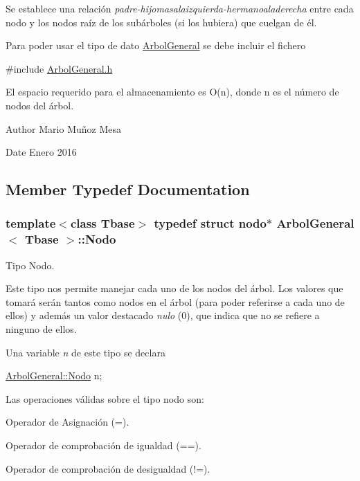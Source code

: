Se establece una relación {\itshape padre-\/hijomasalaizquierda-\/hermanoaladerecha} entre cada nodo y los nodos raíz de los subárboles (si los hubiera) que cuelgan de él.

Para poder usar el tipo de dato \hyperlink{classArbolGeneral}{Arbol\-General} se debe incluir el fichero

{\ttfamily \#include \hyperlink{ArbolGeneral_8h}{Arbol\-General.\-h}}

El espacio requerido para el almacenamiento es O(n), donde n es el número de nodos del árbol.

\begin{DoxyAuthor}{Author}
Mario Muñoz Mesa 
\end{DoxyAuthor}
\begin{DoxyDate}{Date}
Enero 2016 
\end{DoxyDate}


\subsection{Member Typedef Documentation}
\hypertarget{classArbolGeneral_a12cc1b74a9095d89bc7334290d332f7a}{
\subsubsection[{Nodo}]{\setlength{\rightskip}{0pt plus 5cm}template$<$class Tbase$>$ typedef struct nodo$\ast$ {\bf Arbol\-General}$<$ Tbase $>$\-::{\bf Nodo}}}\label{classArbolGeneral_a12cc1b74a9095d89bc7334290d332f7a}


Tipo Nodo. 

Este tipo nos permite manejar cada uno de los nodos del árbol. Los valores que tomará serán tantos como nodos en el árbol (para poder referirse a cada uno de ellos) y además un valor destacado {\itshape nulo} (0), que indica que no se refiere a ninguno de ellos.

Una variable {\itshape n} de este tipo se declara

{\ttfamily \hyperlink{classArbolGeneral_a12cc1b74a9095d89bc7334290d332f7a}{Arbol\-General\-::\-Nodo} n;}

Las operaciones válidas sobre el tipo nodo son\-:


\begin{DoxyItemize}
\item Operador de Asignación (=).
\item Operador de comprobación de igualdad (==).
\item Operador de comprobación de desigualdad (!=). 
\end{DoxyItemize}

